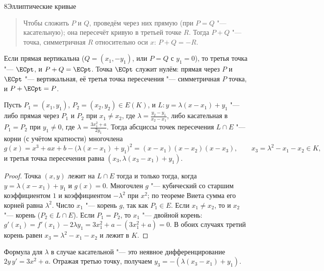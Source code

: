 \begin{lecture}{8}{Эллиптические кривые}
\begin{quote}
Чтобы сложить $P$ и $Q$, проведём через них прямую (при $P = Q$ "--- касательную); она
пересечёт кривую в третьей точке $R$. Тогда $P + Q$ "--- точка, симметричная $R$ относительно
оси $x$: $P + Q = -R$.
\end{quote}

\begin{center}
\ecaddfigure[scale=0.62]\qquad\qquad\ecdoublefigure[scale=0.62]
\end{center}

Если прямая вертикальна ($Q = (x_1, -y_1)$, или $P = Q$ с $y_1 = 0$), то третья точка "---
$\ECpt$, и $P + Q = \ECpt$. Точка $\ECpt$ служит нулём: прямая через $P$ и $\ECpt$ "---
вертикальная, её третья точка пересечения "--- симметричная $P$ точка, и $P + \ECpt = P$.

\begin{lemma}\label{l8:line}
Пусть $P_1 = (x_1, y_1)$, $P_2 = (x_2, y_2) \in E(K)$, и $L\colon y = \lambda(x - x_1) + y_1$ "---
либо прямая через $P_1$ и $P_2$ при $x_1 \ne x_2$, где $\lambda = \frac{y_2 - y_1}{x_2 - x_1}$,
либо касательная в $P_1 = P_2$ при $y_1 \ne 0$, где $\lambda = \frac{3x_1^2 + a}{2y_1}$.
Тогда абсциссы точек пересечения $L \cap E$ "--- корни (с учётом кратности) многочлена
\[
  g(x) = x^3 + ax + b - \bigl(\lambda(x - x_1) + y_1\bigr)^2
  = (x - x_1)(x - x_2)(x - x_3), \qquad x_3 = \lambda^2 - x_1 - x_2 \in K,
\]
и третья точка пересечения равна $(x_3, \lambda(x_3 - x_1) + y_1)$.
\end{lemma}

\begin{proof}
Точка $(x, y)$ лежит на $L \cap E$ тогда и только тогда, когда $y = \lambda(x - x_1) + y_1$
и $g(x) = 0$. Многочлен $g$ "--- кубический со старшим коэффициентом $1$ и коэффициентом
$-\lambda^2$ при $x^2$; по теореме Виета сумма его корней равна $\lambda^2$.
Число $x_1$ "--- корень $g$, так как $P_1 \in E$. Если $x_1 \ne x_2$, то и $x_2$ "--- корень
($P_2 \in L \cap E$). Если $P_1 = P_2$, то $x_1$ "--- двойной корень: $g'(x_1) = f'(x_1) - 2\lambda y_1
= 3x_1^2 + a - (3x_1^2 + a) = 0$. В обоих случаях третий корень равен
$x_3 = \lambda^2 - x_1 - x_2$ и лежит в $K$.
\end{proof}

Формула для $\lambda$ в случае касательной "--- это неявное дифференцирование
$2y\,y' = 3x^2 + a$. Отражая третью точку, получаем $y_3 = -(\lambda(x_3 - x_1) + y_1)$.


\end{lecture}

